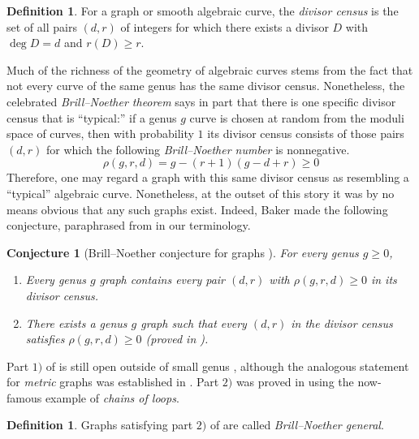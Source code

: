 \documentclass[11pt]{article}
\newtheorem{conjecture}[theo]{Conjecture}
\theoremstyle{definition}
\newtheorem{defi}[theo]{Definition}
\numberwithin{equation}{section}
\begin{document}
\begin{defi}
For a graph or smooth algebraic curve, the \emph{divisor census} is the set of all pairs $(d,r)$ of integers for which there exists a divisor $D$ with $\deg D = d$ and $r(D) \geq r$.
\end{defi}

Much of the richness of the geometry of algebraic curves stems from the fact that not every curve of the same genus has the same divisor census. Nonetheless, the celebrated \emph{Brill--Noether theorem} \cite{gh80} says in part that there is one specific divisor census that is ``typical:'' if a genus $g$ curve is chosen at random from the moduli space of curves, then with probability $1$ its divisor census consists of those pairs $(d,r)$ for which the following \emph{Brill--Noether number} is nonnegative.
$$
\rho(g,r,d) = g - (r+1)(g-d+r) \geq 0
$$
Therefore, one may regard a graph with this same divisor census as resembling a ``typical'' algebraic curve. Nonetheless, at the outset of this story it was by no means obvious that any such graphs exist. Indeed, Baker made the following conjecture, paraphrased from \cite[Conjecture 3.9]{BakerSpec} in our terminology.

\begin{conjecture}[Brill--Noether conjecture for graphs \cite{BakerSpec}]
\label{conj:bn}
For every genus $g \geq 0$,
\begin{enumerate}[label = \arabic*)]
    \item Every genus $g$ graph contains every pair $(d,r)$ with $\rho(g,r,d) \geq 0$ in its divisor census.
    \item There exists a genus $g$ graph such that every $(d,r)$ in the divisor census satisfies $\rho(g,r,d) \geq 0$ (proved in \cite{CDPR12}).
\end{enumerate}
\end{conjecture}

Part $1)$ of  is still open outside of small genus \cite{atanasovRanganathan}, although the analogous statement for \emph{metric} graphs was established in \cite{BakerSpec}. Part $2)$ was proved in \cite{CDPR12} using the now-famous example of \emph{chains of loops}. 

\begin{defi}
Graphs satisfying part $2)$ of  are called \emph{Brill--Noether general}.
\end{defi}
\end{document}
